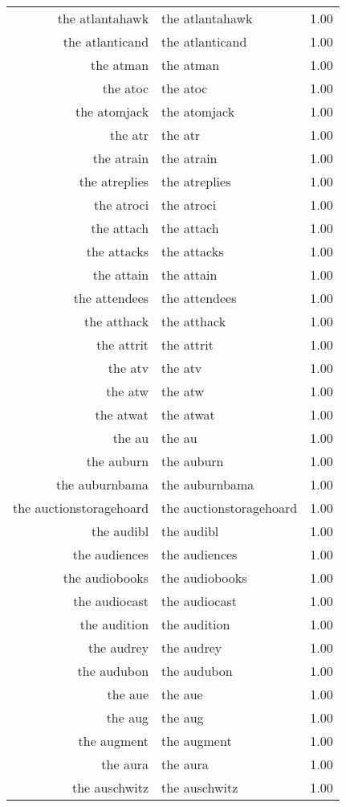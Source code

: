 \begin{table}[ht]
\begin{tabular}{rlr}
  the atlantahawk & the atlantahawk & 1.00 \\ 
  the atlanticand & the atlanticand & 1.00 \\ 
  the atman & the atman & 1.00 \\ 
  the atoc & the atoc & 1.00 \\ 
  the atomjack & the atomjack & 1.00 \\ 
  the atr & the atr & 1.00 \\ 
  the atrain & the atrain & 1.00 \\ 
  the atreplies & the atreplies & 1.00 \\ 
  the atroci & the atroci & 1.00 \\ 
  the attach & the attach & 1.00 \\ 
  the attacks & the attacks & 1.00 \\ 
  the attain & the attain & 1.00 \\ 
  the attendees & the attendees & 1.00 \\ 
  the atthack & the atthack & 1.00 \\ 
  the attrit & the attrit & 1.00 \\ 
  the atv & the atv & 1.00 \\ 
  the atw & the atw & 1.00 \\ 
  the atwat & the atwat & 1.00 \\ 
  the au & the au & 1.00 \\ 
  the auburn & the auburn & 1.00 \\ 
  the auburnbama & the auburnbama & 1.00 \\ 
  the auctionstoragehoard & the auctionstoragehoard & 1.00 \\ 
  the audibl & the audibl & 1.00 \\ 
  the audiences & the audiences & 1.00 \\ 
  the audiobooks & the audiobooks & 1.00 \\ 
  the audiocast & the audiocast & 1.00 \\ 
  the audition & the audition & 1.00 \\ 
  the audrey & the audrey & 1.00 \\ 
  the audubon & the audubon & 1.00 \\ 
  the aue & the aue & 1.00 \\ 
  the aug & the aug & 1.00 \\ 
  the augment & the augment & 1.00 \\ 
  the aura & the aura & 1.00 \\ 
  the auschwitz & the auschwitz & 1.00 \\ 

\end{tabular}
\end{table}
